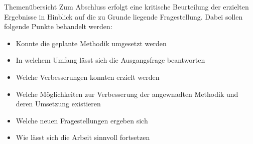 %
\begin{simplebox}{Themenübersicht}
%
Zum Abschluss erfolgt eine kritische Beurteilung der erzielten Ergebnisse in Hinblick auf die zu Grunde liegende Fragestellung. Dabei sollen folgende Punkte behandelt werden:
%
\begin{itemize}
\item Konnte die geplante Methodik umgesetzt werden
\item In welchem Umfang lässt sich die Ausgangsfrage beantworten
\item Welche Verbesserungen konnten erzielt werden
\item Welche Möglichkeiten zur Verbesserung der angewnadten Methodik und deren Umsetzung existieren 
\item Welche neuen Fragestellungen ergeben sich
\item Wie lässt sich die Arbeit sinnvoll fortsetzen
\end{itemize}
%
\end{simplebox}
%